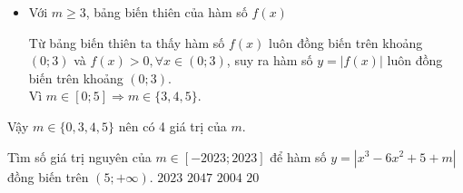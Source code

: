 \begin{ex}
{\begin{enumerate}[TH 1.]
\begin{itemize}
\begin{center}
					\end{center}
					Từ bảng biến thiên ta thấy hàm số $f(x)$, ta thấy hàm số $f(x)$ nghịch biến trên khoảng $(m ; 3)$ và $f(m)>0$ suy ra hàm số $y=|f(x)|$ không thể đồng biến trên khoảng $(0 ; 3)$.
					\item Với $m \geq 3$, bảng biến thiên của hàm số $f(x)$ 
					\begin{center}
					\end{center}
					Từ bảng biến thiên ta thấy hàm số $f(x)$ luôn đồng biến trên khoảng $(0 ; 3)$ và $f(x)>0, \forall x \in(0 ; 3)$, suy ra hàm số $y=|f(x)|$ luôn đồng biến trên khoảng $(0;3)$. \\
					Vì $m \in[0 ; 5] \Rightarrow m \in\{3,4,5\}$.
				\end{itemize} 
			\end{enumerate}
			Vậy $m \in\{0,3,4,5\}$ nên có 4 giá trị của $m$.	}	
	\end{ex}
	

	\begin{ex}%
		Tìm số giá trị nguyên của $m \in [-2023;2023]$ để hàm số $ y=\left|x^3-6x^2+5+m\right| $ đồng biến trên $ \left(5;+\infty\right) $.
		\choice 
		{$ 2023 $}
		{$ 2047 $}
		{\True $ 2004 $}
		{$ 20 $}
	\end{ex}
	
